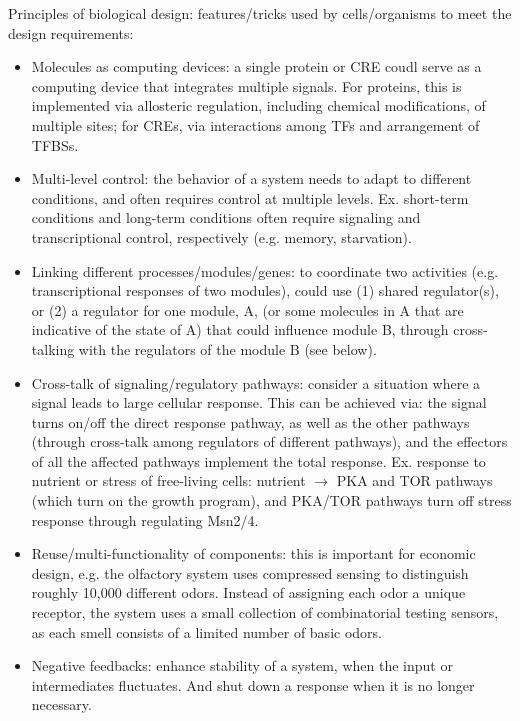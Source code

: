 \documentclass{report}
\begin{document}
Principles of biological design: features/tricks used by cells/organisms to meet the design requirements: 
\begin{itemize}
\item Molecules as computing devices: a single protein or CRE coudl serve as a computing device that integrates multiple signals. For proteins, this is implemented via allosteric regulation, including chemical modifications, of multiple sites; for CREs, via interactions among TFs and arrangement of TFBSs. 

\item Multi-level control: the behavior of a system needs to adapt to different conditions, and often requires control at multiple levels. Ex. short-term conditions and long-term conditions often require signaling and transcriptional control, respectively (e.g. memory, starvation). 

\item Linking different processes/modules/genes: to coordinate two activities (e.g. transcriptional responses of two modules), could use (1) shared regulator(s), or (2) a regulator for one module, A, (or some molecules in A that are indicative of the state of A) that could influence module B, through cross-talking with the regulators of the module B (see below). 

\item Cross-talk of signaling/regulatory pathways: consider a situation where a signal leads to large cellular response. This can be achieved via: the signal turns on/off the direct response pathway, as well as the other pathways (through cross-talk among regulators of different pathways), and the effectors of all the affected pathways implement the total response. Ex. response to nutrient or stress of free-living cells: nutrient $\rightarrow$ PKA and TOR pathways (which turn on the growth program), and PKA/TOR pathways turn off stress response through regulating Msn2/4. 

\item Reuse/multi-functionality of components: this is important for economic design, e.g. the olfactory system uses compressed sensing to distinguish roughly 10,000 different odors. Instead of assigning each odor a unique receptor, the system uses a small collection of combinatorial testing sensors, as each smell consists of a limited number of basic odors.

\item Negative feedbacks: enhance stability of a system, when the input or intermediates fluctuates. And shut down a response when it is no longer necessary. 


\end{itemize}
\end{document}

